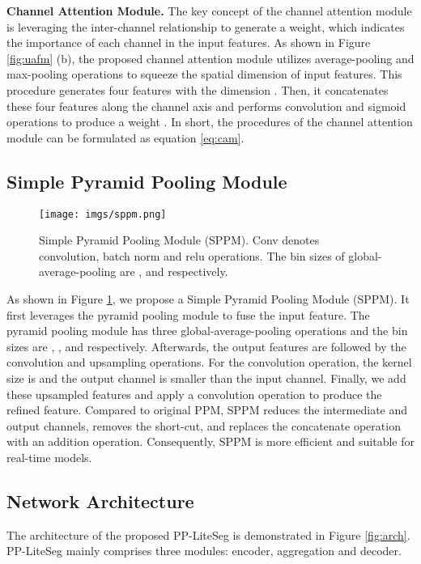 \documentclass[10pt,twocolumn,letterpaper]{article}
\begin{document}
\noindent
\textbf{Channel Attention Module.}
The key concept of the channel attention module is leveraging the inter-channel relationship to generate a weight, which indicates the importance of each channel in the input features.
As shown in Figure \ref{fig:uafm} (b), the proposed channel attention module utilizes average-pooling and max-pooling operations to squeeze the spatial dimension of input features. This procedure generates four features with the dimension .
Then, it concatenates these four features along the channel axis and performs convolution and sigmoid operations to produce a weight .
In short, the procedures of the channel attention module can be formulated as equation \ref{eq:cam}.



\subsection{Simple Pyramid Pooling Module}

\begin{figure}[t]
  \centering
   \texttt{[image: imgs/sppm.png]}
   \caption{Simple Pyramid Pooling Module (SPPM). Conv denotes convolution, batch norm and relu operations. The bin sizes of global-average-pooling are ,  and  respectively. }
   \label{fig:sppm}
\end{figure}

As shown in Figure \ref{fig:sppm}, we propose a Simple Pyramid Pooling Module (SPPM).
It first leverages the pyramid pooling module to fuse the input feature. The pyramid pooling module has three global-average-pooling operations and the bin sizes are , , and  respectively.
Afterwards, the output features are followed by the convolution and upsampling operations. For the convolution operation, the kernel size is  and the output channel is smaller than the input channel.
Finally, we add these upsampled features and apply a convolution operation to produce the refined feature.
Compared to original PPM, SPPM reduces the intermediate and output channels, removes the short-cut, and replaces the concatenate operation with an addition operation. Consequently, SPPM is more efficient and suitable for real-time models. 


\subsection{Network Architecture}

The architecture of the proposed PP-LiteSeg is demonstrated in Figure \ref{fig:arch}. PP-LiteSeg mainly comprises three modules: encoder, aggregation and decoder.
\end{document}
